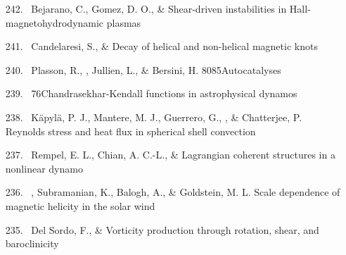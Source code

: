\begin{itemize}
\item[{242.}~]
Bejarano, C., Gomez, D. O., \& \Brandenburg{}
{Shear-driven instabilities in Hall-magnetohydrodynamic plasmas}

\item[{241.}~]
Candelaresi, S., \& \Brandenburg{}
{Decay of helical and non-helical magnetic knots}

\item[{240.}~]
Plasson, R., \Brandenburg, Jullien, L., \& Bersini, H.
{8085}{Autocatalyses}

\item[{239.}~]
\Brandenburg{}
{76}{Chandrasekhar-Kendall functions in astrophysical dynamos}

\item[{238.}~]
K\"apyl\"a, P. J., Mantere, M. J., Guerrero, G., \Brandenburg, \& Chatterjee, P.
{Reynolds stress and heat flux in spherical shell convection}

\item[{237.}~]
Rempel, E. L., Chian, A. C.-L., \& \Brandenburg{}
{Lagrangian coherent structures in a nonlinear dynamo}

\item[{236.}~]
\Brandenburg, Subramanian, K., Balogh, A., \& Goldstein, M. L.
{Scale dependence of magnetic helicity in the solar wind}

\item[{235.}~]
Del Sordo, F., \& \Brandenburg{}
{Vorticity production through rotation, shear, and baroclinicity}


\end{itemize}
